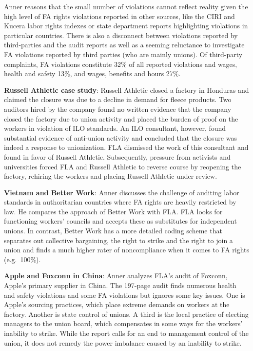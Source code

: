 \documentclass[
  12pt,
]{article}
\begin{document}
Anner reasons that the small number of violations cannot reflect reality
given the high level of FA rights violations reported in other sources,
like the CIRI and Kucera labor rights indexes or state department
reports highlighting violations in particular countries. There is also a
disconnect between violations reported by third-parties and the audit
reports as well as a seeming reluctance to investigate FA violations
reported by third parties (who are mainly unions). Of third-party
complaints, FA violations constitute 32\% of all reported violations and
wages, health and safety 13\%, and wages, benefits and hours 27\%.

\textbf{Russell Athletic case study}: Russell Athletic closed a factory
in Honduras and claimed the closure was due to a decline in demand for
fleece products. Two auditors hired by the company found no written
evidence that the company closed the factory due to union activity and
placed the burden of proof on the workers in violation of ILO standards.
An ILO consultant, however, found substantial evidence of anti-union
activity and concluded that the closure was indeed a response to
unionization. FLA dismissed the work of this consultant and found in
favor of Russell Athletic. Subsequently, pressure from activists and
universities forced FLA and Russell Athletic to reverse course by
reopening the factory, rehiring the workers and placing Russell Athletic
under review.

\textbf{Vietnam and Better Work}: Anner discusses the challenge of
auditing labor standards in authoritarian countries where FA rights are
heavily restricted by law. He compares the approach of Better Work with
FLA. FLA looks for functioning workers' councils and accepts these as
substitutes for independent unions. In contrast, Better Work has a more
detailed coding scheme that separates out collective bargaining, the
right to strike and the right to join a union and finds a much higher
rater of noncompliance when it comes to FA rights (e.g.~100\%).

\textbf{Apple and Foxconn in China}: Anner analyzes FLA's audit of
Foxconn, Apple's primary supplier in China. The 197-page audit finds
numerous health and safety violations and some FA violations but ignores
some key issues. One is Apple's sourcing practices, which place extreme
demands on workers at the factory. Another is state control of unions. A
third is the local practice of electing managers to the union board,
which compensates in some ways for the workers' inability to strike.
While the report calls for an end to management control of the union, it
does not remedy the power imbalance caused by an inability to strike.
\end{document}
